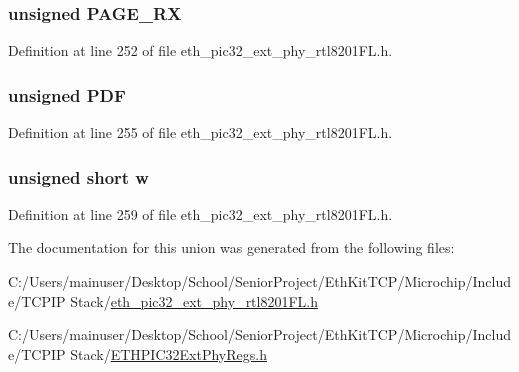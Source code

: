\hypertarget{union_____a_n_e_x_pbits__t_a3495443e84affeecbad3e1d2d8080a70}{}
\subsubsection[{P\+A\+G\+E\+\_\+\+R\+X}]{\setlength{\rightskip}{0pt plus 5cm}unsigned P\+A\+G\+E\+\_\+\+R\+X}\label{union_____a_n_e_x_pbits__t_a3495443e84affeecbad3e1d2d8080a70}


Definition at line 252 of file eth\+\_\+pic32\+\_\+ext\+\_\+phy\+\_\+rtl8201\+F\+L.\+h.

\hypertarget{union_____a_n_e_x_pbits__t_a8c5bd7f969fa0ca92985a42453435c4f}{}
\subsubsection[{P\+D\+F}]{\setlength{\rightskip}{0pt plus 5cm}unsigned P\+D\+F}\label{union_____a_n_e_x_pbits__t_a8c5bd7f969fa0ca92985a42453435c4f}


Definition at line 255 of file eth\+\_\+pic32\+\_\+ext\+\_\+phy\+\_\+rtl8201\+F\+L.\+h.

\hypertarget{union_____a_n_e_x_pbits__t_a160850a4684a3e82c2323033964f2e98}{}
\subsubsection[{w}]{\setlength{\rightskip}{0pt plus 5cm}unsigned short w}\label{union_____a_n_e_x_pbits__t_a160850a4684a3e82c2323033964f2e98}


Definition at line 259 of file eth\+\_\+pic32\+\_\+ext\+\_\+phy\+\_\+rtl8201\+F\+L.\+h.



The documentation for this union was generated from the following files\+:\begin{DoxyCompactItemize}
\item 
C\+:/\+Users/mainuser/\+Desktop/\+School/\+Senior\+Project/\+Eth\+Kit\+T\+C\+P/\+Microchip/\+Include/\+T\+C\+P\+I\+P Stack/\hyperlink{eth__pic32__ext__phy__rtl8201_f_l_8h}{eth\+\_\+pic32\+\_\+ext\+\_\+phy\+\_\+rtl8201\+F\+L.\+h}\item 
C\+:/\+Users/mainuser/\+Desktop/\+School/\+Senior\+Project/\+Eth\+Kit\+T\+C\+P/\+Microchip/\+Include/\+T\+C\+P\+I\+P Stack/\hyperlink{_e_t_h_p_i_c32_ext_phy_regs_8h}{E\+T\+H\+P\+I\+C32\+Ext\+Phy\+Regs.\+h}\end{DoxyCompactItemize}

